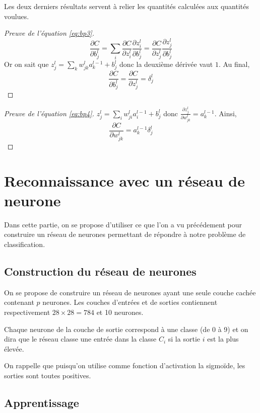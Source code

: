 Les deux derniers résultats servent à relier les quantités calculées aux 
quantités voulues.

\begin{proof}[Preuve de l'équation \ref{eq:bp3}]
\[
\frac{\partial C}{\partial b_{j}^{l}} =
 \sum_{i} \frac{\partial C}{\partial z_{i}^{l}} \frac{\partial z_{i}^{l}}{\partial b_{j}^{l}} =
 \frac{\partial C}{\partial z_{j}^{l}} \frac{\partial z_{j}^{l}}{\partial b_{j}^{l}}
\]
Or on sait que $z_{j}^{l} = \sum_{k} w_{jk}^{l} a_{k}^{l-1} + b_{j}^{l}$ donc la deuxième dérivée vaut $1$.
Au final,
\[
\frac{\partial C}{\partial b_{j}^{l}} = \frac{\partial C}{\partial z_{j}^{l}} = \delta_{j}^{l}
\]
\end{proof}

\begin{proof}[Preuve de l'équation \ref{eq:bp4}]
$z_{j}^{l} = \sum_{i} w_{ji}^{l} a_{i}^{l-1} + b_{j}^{l}$ donc $\frac{\partial z_{j}^{l}}{\partial w_{jk}^{l}} = a_{k}^{l-1}$.
Ainsi, 
\[
\frac{\partial C}{\partial w_{jk}^{l}} = a_{k}^{l-1} \delta_{j}^{l}
\]
\end{proof}



\section{Reconnaissance avec un réseau de neurone}

Dans cette partie, on se propose d'utiliser ce que l'on a vu 
précédement pour construire un réseau de neurones permettant 
de répondre à notre problème de classification.


\subsection{Construction du réseau de neurones}

On se propose de construire un réseau de neurones ayant une 
seule couche cachée contenant $p$ neurones. 
Les couches d'entrées et de sorties contiennent respectivement 
$28 \times 28 = 784$ et 10 neurones.

Chaque neurone de la couche de sortie correspond à une classe 
(de 0 à 9) et on dira que le réseau classe une entrée dans la 
classe $C_i$ si la sortie $i$ est la plus élevée.

On rappelle que puisqu'on utilise comme fonction d'activation 
la sigmoïde, les sorties sont toutes positives.


\subsection{Apprentissage}

